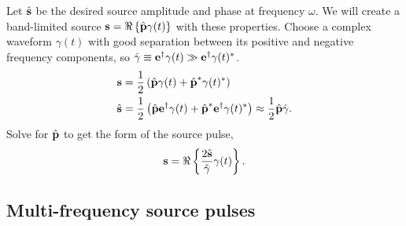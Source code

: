Let $\hat{\textbf{s}}$ be the desired source amplitude and phase at frequency $\omega$.  We will create a band-limited source $\textbf{s} = \Re \left\{ \hat{\textbf{p}} \gamma(t) \right\}$ with these properties.  Choose a complex waveform $\gamma(t)$ with good separation between its positive and negative frequency components, so $\hat \gamma \equiv \textbf{e}^\dagger \gamma(t) \gg \textbf{e}^\dagger \gamma(t)^\ast$.
%
\begin{equation}
\begin{aligned}
\textbf{s} &= \frac{1}{2} \left( \hat{\textbf{p}} \gamma(t) + \hat{\textbf{p}}^\ast \gamma(t)^\ast \right) \\
\hat{\textbf{s}} &= \frac{1}{2} \left( \hat{\textbf{p}} \textbf{e}^\dagger \gamma(t) + \hat{\textbf{p}}^\ast \textbf{e}^\dagger \gamma(t)^\ast \right) \approx \frac{1}{2} \hat{\textbf{p}} \hat{\gamma}.
\end{aligned}
\end{equation}
%
Solve for $\hat{\textbf{p}}$ to get the form of the source pulse,
%
\begin{equation}
\textbf{s} = \Re \left\{ \frac{2\hat{\textbf{s}} }{\hat \gamma} \gamma(t) \right\}.
\end{equation}


\subsection{Multi-frequency source pulses}

